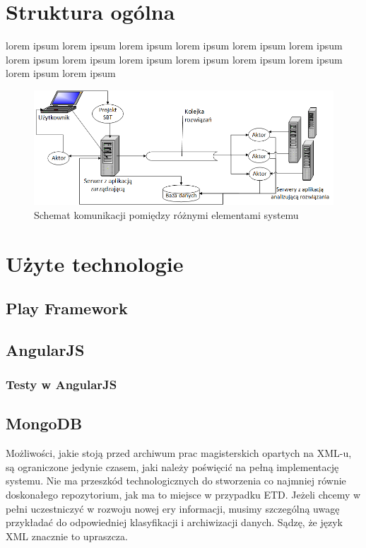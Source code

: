 \documentclass[brudnopis]{xmgr}
\begin{document}
\section{Struktura ogólna}

lorem ipsum lorem ipsum lorem ipsum lorem ipsum lorem ipsum lorem ipsum lorem ipsum lorem ipsum lorem ipsum lorem ipsum lorem ipsum lorem ipsum lorem ipsum lorem ipsum 

\begin{figure}[h]
\centering 
\includegraphics[width=1.05\hsize]{fig/scaxerciser_schemat}
\caption{Schemat komunikacji pomiędzy różnymi elementami systemu}
\end{figure}

\section{Użyte technologie}

\subsection{Play Framework}

\subsection{AngularJS}

\subsubsection{Testy w AngularJS}

\subsection{MongoDB}

\summary
Możliwości, jakie stoją przed archiwum prac magisterskich opartych na
XML-u, są ograniczone jedynie czasem, jaki należy poświęcić na pełną
implementację systemu. Nie ma przeszkód technologicznych do stworzenia
co najmniej równie doskonałego repozytorium, jak ma to miejsce w
przypadku ETD. Jeżeli chcemy w pełni uczestniczyć w rozwoju nowej ery
informacji, musimy szczególną uwagę przykładać do odpowiedniej
klasyfikacji i archiwizacji danych. Sądzę, że język XML znacznie to
upraszcza.
\end{document}
